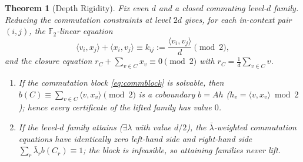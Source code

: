 \documentclass[11pt]{article}
\newtheorem{theorem}{Theorem}
\theoremstyle{definition}
\theoremstyle{remark}
\newcommand{\F}{\mathbb{F}}
\newcommand{\ip}[2]{\langle #1,#2\rangle}
\begin{document}
\begin{theorem}[Depth Rigidity]\label{thm:depth}
Fix even $d$ and a closed commuting level-$d$ family. Reducing the commutation constraints at level
$2d$ gives, for each in-context pair $(i,j)$, the $\F_2$-linear equation
\begin{equation}\label{eq:commblock}
\ip{v_i}{x_j}+\ip{x_i}{v_j}\equiv k_{ij}:=\frac{\ip{v_i}{v_j}}{d}\pmod2 ,
\end{equation}
and the closure equation $r_C+\sum_{v\in C}x_v\equiv0\pmod2$ with $r_C=\tfrac1d\sum_{v\in C}v$.
\begin{enumerate}[label=(\alph*),leftmargin=2.2em,itemsep=1pt]
\item If the commutation block \eqref{eq:commblock} is solvable, then $b(C)\equiv\sum_{v\in
C}\ip{v}{x_v}\pmod2$ is a coboundary $b=A h$ ($h_v=\ip{v}{x_v}\bmod2$); hence every certificate of
the lifted family has value $0$.
\item If the level-$d$ family attains ($\exists\lambda$ with value $d/2$), the $\bar\lambda$-weighted
commutation equations have identically zero left-hand side and right-hand side
$\sum_r\bar\lambda_rb(C_r)\equiv1$; the block is infeasible, so \emph{attaining families never lift}.
\end{enumerate}
\end{theorem}
\end{document}
